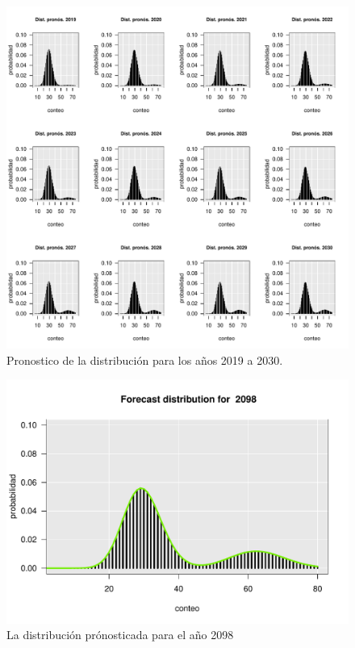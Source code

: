 \documentclass[a4paper]{article}\usepackage[]{graphicx}\usepackage[]{color}
\makeatletter
\def\maxwidth{ %
  \ifdim\Gin@nat@width>\linewidth
    \linewidth
  \else
    \Gin@nat@width
  \fi
}
\newenvironment{knitrout}{}{} %
\makeatother
\begin{document}
\begin{knitrout}
\color{fgcolor}\begin{figure}
\includegraphics[width=\maxwidth]{figure/unnamed-chunk-20-1} \caption[Pronostico de la distribución para los años 2019 a 2030]{Pronostico de la distribución para los años 2019 a 2030.}\label{fig:unnamed-chunk-20}
\end{figure}


\end{knitrout}


\begin{knitrout}
\color{fgcolor}\begin{figure}[t]
\includegraphics[width=\maxwidth]{figure/unnamed-chunk-21-1} \caption[La distribución prónosticada para el año 2098]{La distribución prónosticada para el año 2098}\label{fig:unnamed-chunk-21}
\end{figure}


\end{knitrout}
\end{document}

